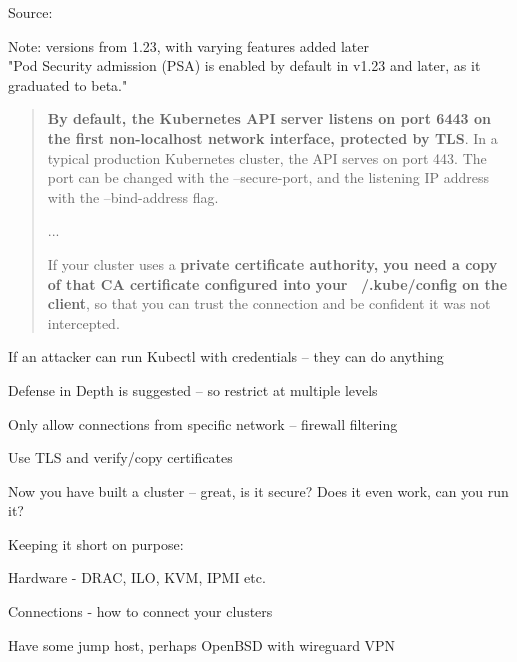 \documentclass[Screen16to9,17pt]{foils}
\begin{document}

Source: 

\begin{list2}
\item Note: versions from 1.23, with varying features added later\\
"Pod Security admission (PSA) is enabled by default in v1.23 and later, as it graduated to beta."
\end{list2}



\begin{quote}{\bf
By default, the Kubernetes API server listens on port 6443 on the first non-localhost network interface, protected by TLS}. In a typical production Kubernetes cluster, the API serves on port 443. The port can be changed with the --secure-port, and the listening IP address with the --bind-address flag.

...

If your cluster uses a {\bf private certificate authority, you need a copy of that CA certificate configured into your ~/.kube/config on the client}, so that you can trust the connection and be confident it was not intercepted.
\end{quote}

\begin{list2}
\item If an attacker can run Kubectl with credentials -- they can do anything
\item Defense in Depth is suggested -- so restrict at multiple levels
\item Only allow connections from specific network -- firewall filtering
\item Use TLS and verify/copy certificates
\end{list2}


Now you have built a cluster -- great, is it secure? Does it even work, can you run it?

Keeping it short on purpose:
\begin{list2}
\item Hardware - DRAC, ILO, KVM, IPMI etc.
\item Connections - how to connect your clusters
\item Have some jump host, perhaps OpenBSD with wireguard VPN
\end{list2}
\end{document}
